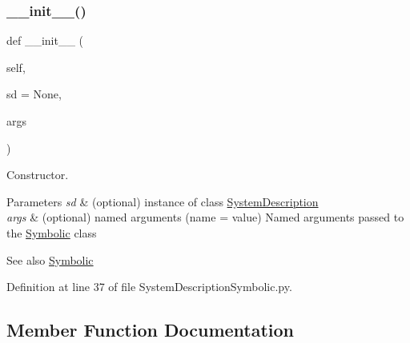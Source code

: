 \subsubsection{\texorpdfstring{\+\_\+\+\_\+init\+\_\+\+\_\+()}{\_\_init\_\_()}}
{\footnotesize\ttfamily def \+\_\+\+\_\+init\+\_\+\+\_\+ (\begin{DoxyParamCaption}\item[{}]{self,  }\item[{}]{sd = {\ttfamily None},  }\item[{}]{args }\end{DoxyParamCaption})}



Constructor. 


\begin{DoxyParams}{Parameters}
{\em sd} & (optional) instance of class \hyperlink{namespaceSignalIntegrity_1_1SystemDescriptions_1_1SystemDescription}{System\+Description} \\
\hline
{\em args} & (optional) named arguments (name = value) Named arguments passed to the \hyperlink{namespaceSignalIntegrity_1_1SystemDescriptions_1_1Symbolic}{Symbolic} class \\
\hline
\end{DoxyParams}
\begin{DoxySeeAlso}{See also}
\hyperlink{namespaceSignalIntegrity_1_1SystemDescriptions_1_1Symbolic}{Symbolic} 
\end{DoxySeeAlso}


Definition at line 37 of file System\+Description\+Symbolic.\+py.



\subsection{Member Function Documentation}
\mbox{\label{classSignalIntegrity_1_1SystemDescriptions_1_1SystemDescriptionSymbolic_1_1SystemDescriptionSymbolic_ab91378c2a97ec0d38ee1c70988142eb5}} 
